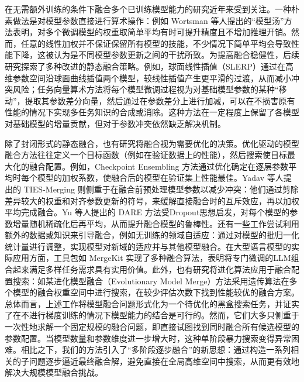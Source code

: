 \documentclass[../main.tex]{subfiles}
\begin{document}

在无需额外训练的条件下融合多个已训练模型能力的研究近年来受到关注。一种朴素做法是对模型参数直接进行算术操作：例如 Wortsman 等人提出的“模型汤”方法表明，对多个微调模型的权重取简单平均有时可提升精度且不增加推理开销。然而，任意的线性加权并不保证保留所有模型的技能，不少情况下简单平均会导致性能下降，这被认为是不同模型参数更新之间的干扰所致。为提高融合稳健性，后续研究探索了多种改进的静态融合策略。例如，球面线性插值（SLERP）通过在高维参数空间沿球面曲线插值两个模型，较线性插值产生更平滑的过渡，从而减小冲突风险；任务向量算术方法将每个模型微调过程视为对基础模型参数的某种“移动”，提取其参数差分向量，然后通过在参数差分上进行加减，可以在不损害原有性能的情况下实现多任务知识的合成或消除。这种方法在一定程度上保留了各模型对基础模型的增量贡献，但对于参数冲突依然缺乏解决机制。

除了封闭形式的静态融合，也有研究将融合视为需要优化的决策。优化驱动的模型融合方法往往定义一个目标函数（例如在验证数据上的性能），然后搜索使目标最大化的融合配置。例如，Checkpoint Ensembling 方法通过优化确定在逐层参数平均时每个模型的加权系数，使融合后的模型在验证集上性能最佳。Yadav 等人提出的 TIES-Merging 则侧重于在融合前预处理模型参数以减少冲突：他们通过剪除差异较大的权重和对齐参数更新的符号，来缓解直接融合时的互斥效应，再以加权平均完成融合。Yu 等人提出的 DARE 方法受Dropout思想启发，对每个模型的参数增量随机稀疏化后再平均，从而提升融合模型的鲁棒性。还有一些工作尝试利用额外的数据或知识来引导融合，例如无训练的领域自适应：通过对模型的批归一化统计量进行调整，实现模型对新域的适应并与其他模型融合。在大型语言模型的实际应用方面，工具包如 MergeKit 实现了多种融合算法，表明将专门微调的LLM组合起来满足多样任务需求具有实用价值。此外，也有研究将进化算法应用于融合配置搜索：如某进化模型融合（Evolutionary Model Merge）方法采用遗传算法在多个模型的融合权重空间中进行搜索，在较少评估次数下找到性能较优的融合方案。总体而言，上述工作将模型融合问题形式化为一个待优化的黑盒搜索任务，并证实了在不进行梯度训练的情况下模型能力的结合是可行的。然而，它们大多只侧重于一次性地求解一个固定规模的融合问题，即直接试图找到同时融合所有候选模型的参数配置。当模型数量和参数维度进一步增大时，这种单阶段暴力搜索变得异常困难。相比之下，我们的方法引入了“多阶段逐步融合”的新思想：通过构造一系列相关的子问题逐步逼近最终融合解，避免直接在全局高维空间中搜索，从而更有效地解决大规模模型融合挑战。
\end{document}
